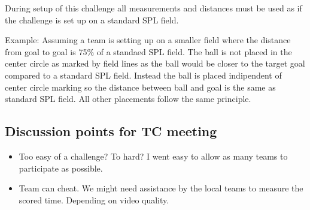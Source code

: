 During setup of this challenge all measurements and distances must be used as if the challenge is set up on a standard SPL field.

Example: Assuming a team is setting up on a smaller field where the distance from goal to goal is 75\% of a standaed SPL field. The ball is not placed in the center circle as marked by field lines as the ball would be closer to the target goal compared to a standard SPL field. Instead the ball is placed indipendent of center circle marking so the distance between ball and goal is the same as standard SPL field. All other placements follow the same principle.

\subsection{Discussion points for TC meeting}

\begin{itemize}
	\item Too easy of a challenge? To hard? I went easy to allow as many teams to participate as possible.
	\item Team can cheat. We might need assistance by the local teams to measure the scored time. Depending on video quality.
\end{itemize}
